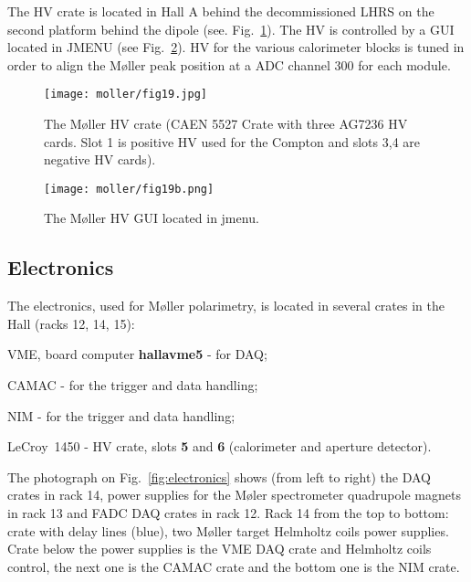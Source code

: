 { The HV crate is located in Hall A behind the decommissioned LHRS on the second platform behind the dipole  (see. Fig.~\ref{fig:moller_hv}). 
 The HV is controlled by a GUI located in JMENU (see Fig.~\ref{fig:mollerHVgui}).
 HV for the various calorimeter blocks is tuned in order to align the M{\o}ller peak
 position at a ADC channel 300 for each module.

   \begin{figure}%
      \begin{center}
          \texttt{[image: moller/fig19.jpg]}
      \end{center}
      \caption[M{\o}ller:HV]{The M{\o}ller HV crate (CAEN 5527 Crate with three AG7236 HV cards.  Slot 1 is positive HV used for the Compton and slots 3,4 are negative HV cards).}
      \label{fig:moller_hv} 
   \end{figure}

   \begin{figure}%
      \begin{center}
          \texttt{[image: moller/fig19b.png]}
      \end{center}
      \caption[M{\o}ller:HV]{The M{\o}ller HV GUI located in jmenu.
            }
      \label{fig:mollerHVgui} 
   \end{figure}     

\subsection {Electronics}
\label{sec:moller_compon_ele}
\vspace{-\parskip}
 The electronics, used for M{\o}ller polarimetry, is located
 in several crates in the Hall (racks 12, 14, 15):
\vspace{-\parskip}
\begin{list}{}{\setlength{\itemsep}{-0.15cm}}
  \item[1.] VME, board computer {\bf hallavme5} - for DAQ;
  \item[2.] CAMAC - for the trigger and data handling;
  \item[3.] NIM - for the trigger and data handling;
  \item[4.] LeCroy~1450 - HV crate, slots {\bf 5} and {\bf 6}
            (calorimeter and aperture detector).
\end{list}
\noindent
   The photograph on Fig.~\ref{fig:electronics} shows (from left to right) the 
   DAQ crates in rack 14, power supplies for the M{\o}ler spectrometer quadrupole 
   magnets in rack 13 and FADC DAQ crates in rack 12. Rack 14 from the top to bottom: 
   crate with delay lines (blue), two M{\o}ller target Helmholtz coils power supplies. 
   Crate below the power supplies is the VME DAQ crate and Helmholtz coils control, 
   the next one is the CAMAC crate and the bottom one is the NIM crate.

}
